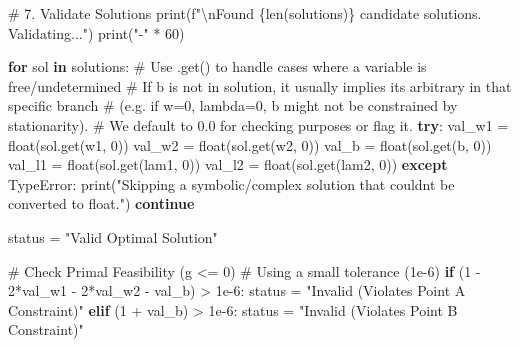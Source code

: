 \documentclass[
  letterpaper,
  DIV=11,
  numbers=noendperiod]{scrreprt}
\newenvironment{Shaded}{\begin{snugshade}}{\end{snugshade}}
\newcommand{\BuiltInTok}[1]{\textcolor[rgb]{0.00,0.23,0.31}{#1}}
\newcommand{\CharTok}[1]{\textcolor[rgb]{0.13,0.47,0.30}{#1}}
\newcommand{\CommentTok}[1]{\textcolor[rgb]{0.37,0.37,0.37}{#1}}
\newcommand{\ControlFlowTok}[1]{\textcolor[rgb]{0.00,0.23,0.31}{\textbf{#1}}}
\newcommand{\DecValTok}[1]{\textcolor[rgb]{0.68,0.00,0.00}{#1}}
\newcommand{\FloatTok}[1]{\textcolor[rgb]{0.68,0.00,0.00}{#1}}
\newcommand{\KeywordTok}[1]{\textcolor[rgb]{0.00,0.23,0.31}{\textbf{#1}}}
\newcommand{\NormalTok}[1]{\textcolor[rgb]{0.00,0.23,0.31}{#1}}
\newcommand{\OperatorTok}[1]{\textcolor[rgb]{0.37,0.37,0.37}{#1}}
\newcommand{\PreprocessorTok}[1]{\textcolor[rgb]{0.68,0.00,0.00}{#1}}
\newcommand{\SpecialCharTok}[1]{\textcolor[rgb]{0.37,0.37,0.37}{#1}}
\newcommand{\SpecialStringTok}[1]{\textcolor[rgb]{0.13,0.47,0.30}{#1}}
\newcommand{\StringTok}[1]{\textcolor[rgb]{0.13,0.47,0.30}{#1}}
\begin{document}
\begin{Shaded}
\begin{Highlighting}[]
\CommentTok{\# 7. Validate Solutions}
\BuiltInTok{print}\NormalTok{(}\SpecialStringTok{f"}\CharTok{\textbackslash{}n}\SpecialStringTok{Found }\SpecialCharTok{\{}\BuiltInTok{len}\NormalTok{(solutions)}\SpecialCharTok{\}}\SpecialStringTok{ candidate solutions. Validating..."}\NormalTok{)}
\BuiltInTok{print}\NormalTok{(}\StringTok{"{-}"} \OperatorTok{*} \DecValTok{60}\NormalTok{)}

\ControlFlowTok{for}\NormalTok{ sol }\KeywordTok{in}\NormalTok{ solutions:}
    \CommentTok{\# Use .get() to handle cases where a variable is free/undetermined}
    \CommentTok{\# If b is not in solution, it usually implies it\textquotesingle{}s arbitrary in that specific branch }
    \CommentTok{\# (e.g. if w=0, lambda=0, b might not be constrained by stationarity).}
    \CommentTok{\# We default to 0.0 for checking purposes or flag it.}
    \ControlFlowTok{try}\NormalTok{:}
\NormalTok{        val\_w1 }\OperatorTok{=} \BuiltInTok{float}\NormalTok{(sol.get(w1, }\DecValTok{0}\NormalTok{))}
\NormalTok{        val\_w2 }\OperatorTok{=} \BuiltInTok{float}\NormalTok{(sol.get(w2, }\DecValTok{0}\NormalTok{))}
\NormalTok{        val\_b  }\OperatorTok{=} \BuiltInTok{float}\NormalTok{(sol.get(b, }\DecValTok{0}\NormalTok{)) }
\NormalTok{        val\_l1 }\OperatorTok{=} \BuiltInTok{float}\NormalTok{(sol.get(lam1, }\DecValTok{0}\NormalTok{))}
\NormalTok{        val\_l2 }\OperatorTok{=} \BuiltInTok{float}\NormalTok{(sol.get(lam2, }\DecValTok{0}\NormalTok{))}
    \ControlFlowTok{except} \PreprocessorTok{TypeError}\NormalTok{:}
        \BuiltInTok{print}\NormalTok{(}\StringTok{"Skipping a symbolic/complex solution that couldn\textquotesingle{}t be converted to float."}\NormalTok{)}
        \ControlFlowTok{continue}

\NormalTok{    status }\OperatorTok{=} \StringTok{"Valid Optimal Solution"}

    \CommentTok{\# Check Primal Feasibility (g \textless{}= 0)}
    \CommentTok{\# Using a small tolerance (1e{-}6)}
    \ControlFlowTok{if}\NormalTok{ (}\DecValTok{1} \OperatorTok{{-}} \DecValTok{2}\OperatorTok{*}\NormalTok{val\_w1 }\OperatorTok{{-}} \DecValTok{2}\OperatorTok{*}\NormalTok{val\_w2 }\OperatorTok{{-}}\NormalTok{ val\_b) }\OperatorTok{\textgreater{}} \FloatTok{1e{-}6}\NormalTok{:}
\NormalTok{        status }\OperatorTok{=} \StringTok{"Invalid (Violates Point A Constraint)"}
    \ControlFlowTok{elif}\NormalTok{ (}\DecValTok{1} \OperatorTok{+}\NormalTok{ val\_b) }\OperatorTok{\textgreater{}} \FloatTok{1e{-}6}\NormalTok{:}
\NormalTok{        status }\OperatorTok{=} \StringTok{"Invalid (Violates Point B Constraint)"}
    

\end{Highlighting}
\end{Shaded}
\end{document}
